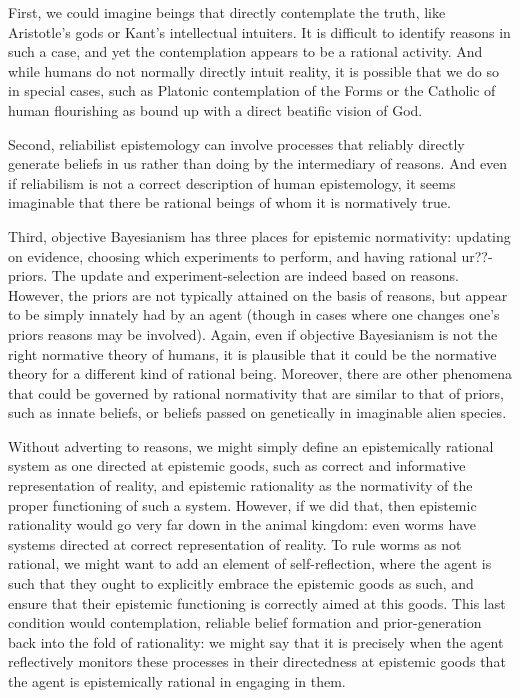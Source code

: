 First, we could imagine beings that directly contemplate the truth, like Aristotle's gods or Kant's intellectual
intuiters. It is difficult to identify reasons in such a case, and yet the contemplation appears to be a rational
activity. And while humans do not normally directly intuit reality, it is possible that we do so in special cases,
such as Platonic contemplation of the Forms or the Catholic of human flourishing as bound up with a direct beatific
vision of God. 

Second, reliabilist epistemology can involve processes that reliably directly generate beliefs in us rather than 
doing by the intermediary of reasons. And even if reliabilism is not a correct description of human epistemology,
it seems imaginable that there be rational beings of whom it is normatively true.

Third, objective Bayesianism has three places for epistemic normativity: updating on evidence, choosing which 
experiments to perform, and having rational ur??-priors. The update and experiment-selection are indeed based on 
reasons. However, the priors are not typically attained on the basis of reasons, but appear to be simply innately 
had by an agent (though in cases where one changes one's priors reasons may be involved). Again, even if objective 
Bayesianism is not the right normative theory of humans, it is plausible that it could be the normative theory for 
a different kind of rational being. Moreover, there are other phenomena that could be governed by rational 
normativity that are similar to that of priors, such as innate beliefs, or beliefs passed on genetically in 
imaginable alien species. 

Without adverting to reasons, we might simply define an epistemically rational system as one directed at 
epistemic goods, such as correct and informative representation of reality, and epistemic rationality as 
the normativity of the proper functioning of such a system. However, if we did that, then epistemic rationality
would go very far down in the animal kingdom: even worms have systems directed at correct representation of 
reality. To rule worms as not rational, we might want to add an element of self-reflection, where the agent 
is such that they ought to explicitly embrace the epistemic goods as such, and ensure that their epistemic 
functioning is correctly aimed at this goods. This last condition would contemplation, reliable
belief formation and prior-generation back into the fold of rationality: we might say that it is precisely 
when the agent reflectively monitors these processes in their directedness at epistemic goods that the 
agent is epistemically rational in engaging in them. 

